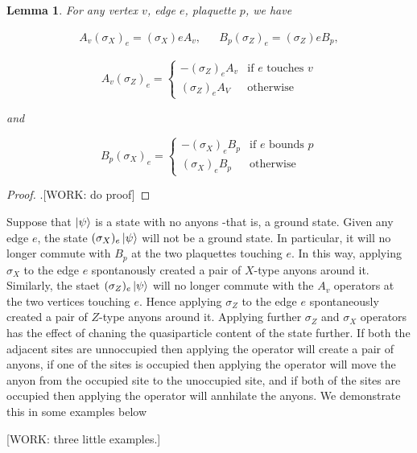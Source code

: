 \documentclass{article}
\newtheorem{lemma}{Lemma}[section]
\theoremstyle{definition}
\numberwithin{figure}{section}
\begin{document}
\begin{lemma} For any vertex $v$, edge $e$, plaquette $p$, we have

\begin{align*}
A_v  (\sigma_X)_e=(\sigma_X)e A_v, && B_p (\sigma_Z)_e=(\sigma_Z)e B_p,
\end{align*}

\begin{equation*}
A_v (\sigma_Z)_e=
\begin{cases}
- (\sigma_Z)_e A_v & \text{if $e$ touches $v$}\\
(\sigma_Z)_e A_V & \text{otherwise}
\end{cases}
\end{equation*}

and

\begin{equation*}
B_p (\sigma_X)_e=
\begin{cases}
- (\sigma_X)_e B_p & \text{if $e$ bounds $p$}\\
(\sigma_X)_e B_p & \text{otherwise}
\end{cases}
\end{equation*}


\end{lemma}
\begin{proof}.[WORK: do proof]
\end{proof}

Suppose that $\ket{\psi}$ is a state with no anyons -that is, a ground state. Given any edge $e$, the state $(\sigma_X)_e \ket{\psi}$ will not be a ground state. In particular, it will no longer commute with $B_p$ at the two plaquettes touching $e$. In this way, applying $\sigma_X$ to the edge $e$ spontanously created a pair of $X$-type anyons around it. Similarly, the staet $(\sigma_Z)_e\ket{\psi}$ will no longer commute with the $A_v$ operators at the two vertices touching $e$. Hence applying $\sigma_Z$ to the edge $e$ spontaneously created a pair of $Z$-type anyons around it. Applying further $\sigma_Z$ and $\sigma_X$ operators has the effect of chaning the quasiparticle content of the state further. If both the adjacent sites are unnoccupied then applying the operator will create a pair of anyons, if one of the sites is occupied then applying the operator will move the anyon from the occupied site to the unoccupied site, and if both of the sites are occupied then applying the operator will annhilate the anyons. We demonstrate this in some examples below

[WORK: three little examples.]
\end{document}
